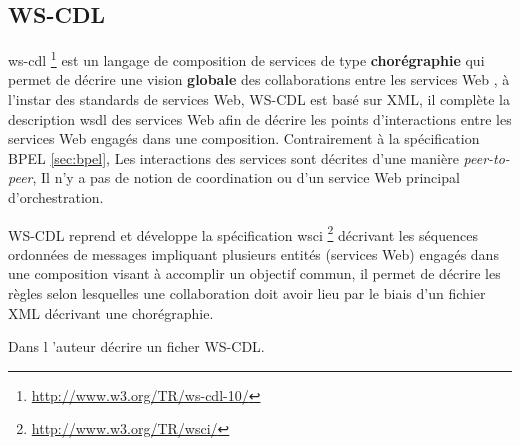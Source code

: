 
    \subsection{WS-CDL}
    \label{sec:WS-CDL}
    \acrshort{ws-cdl} \footnote{\url{http://www.w3.org/TR/ws-cdl-10/}}
    \cite{kavantzas2005web} est un langage de composition de services
    de type \textbf{chorégraphie} qui permet de décrire une vision
    \textbf{globale} des collaborations entre les services Web
    \cite{elie2010}, à l'instar des standards de services Web,
    \textsc{WS-CDL} est basé sur \textsc{XML}, il complète la
    description \acrshort{wsdl} des services Web afin de décrire les
    points d'interactions entre les services Web engagés dans une
    composition. Contrairement à la spécification \textsc{BPEL}
    \ref{sec:bpel}, Les interactions des services sont décrites d'une
    manière \textit{peer-to-peer}, Il n'y a pas de notion de
    coordination ou d'un service Web principal d'orchestration.

    \textsc{WS-CDL} reprend et développe la spécification
    \acrshort{wsci} \footnote{\url{http://www.w3.org/TR/wsci/}}
    \cite{arkin2002web} décrivant les séquences ordonnées de messages
    impliquant plusieurs entités (services Web) engagés dans une
    composition visant à accomplir un objectif commun, il permet de
    décrire les règles selon lesquelles une collaboration doit avoir
    lieu par le biais d'un fichier \textsc{XML} décrivant une
    chorégraphie.

    { \color{red}
      Dans \cite{fredlund2006implementing} l 'auteur décrire un ficher
      WS-CDL.
    }

